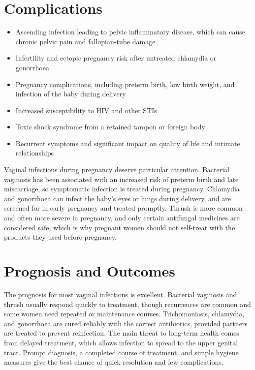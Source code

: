 \section*{Complications}
\begin{itemize}
    \item Ascending infection leading to pelvic inflammatory disease, which can cause chronic pelvic pain and fallopian-tube damage
    \item Infertility and ectopic pregnancy risk after untreated chlamydia or gonorrhoea
    \item Pregnancy complications, including preterm birth, low birth weight, and infection of the baby during delivery
    \item Increased susceptibility to HIV and other STIs
    \item Toxic shock syndrome from a retained tampon or foreign body
    \item Recurrent symptoms and significant impact on quality of life and intimate relationships
\end{itemize}

Vaginal infections during pregnancy deserve particular attention. Bacterial vaginosis has been associated with an increased risk of preterm birth and late miscarriage, so symptomatic infection is treated during pregnancy. Chlamydia and gonorrhoea can infect the baby's eyes or lungs during delivery, and are screened for in early pregnancy and treated promptly. Thrush is more common and often more severe in pregnancy, and only certain antifungal medicines are considered safe, which is why pregnant women should not self-treat with the products they used before pregnancy.

\section*{Prognosis and Outcomes}
The prognosis for most vaginal infections is excellent. Bacterial vaginosis and thrush usually respond quickly to treatment, though recurrences are common and some women need repeated or maintenance courses. Trichomoniasis, chlamydia, and gonorrhoea are cured reliably with the correct antibiotics, provided partners are treated to prevent reinfection. The main threat to long-term health comes from delayed treatment, which allows infection to spread to the upper genital tract. Prompt diagnosis, a completed course of treatment, and simple hygiene measures give the best chance of quick resolution and few complications.

